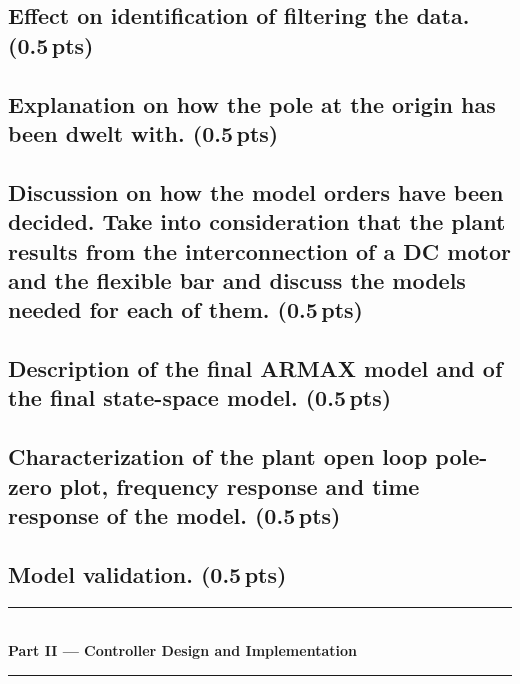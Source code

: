 \documentclass[a4paper,12pt]{article}
\begin{document}
\subsection{Effect on identification of filtering the data. (0.5\,pts)}
\vspace{10pt}


\subsection{Explanation on how the pole at the origin has been dwelt with. (0.5\,pts)}
\vspace{10pt}


\subsection{Discussion on how the model orders have been decided. Take into consideration that the plant results from the interconnection of a DC motor and the flexible bar and discuss the models needed for each of them. (0.5\,pts)}
\vspace{10pt}


\subsection{Description of the final ARMAX model and of the final state-space model. (0.5\,pts)}
\vspace{10pt}


\subsection{Characterization of the plant open loop pole-zero plot, frequency response and time response of the model. (0.5\,pts)}
\vspace{10pt}


\subsection{Model validation. (0.5\,pts)}
\vspace{10pt}



\vspace{6pt}
\noindent\rule{\textwidth}{0.8pt}\\[-4pt]
{\Large\bfseries Part II --- Controller Design and Implementation}\\[-6pt]
\noindent\rule{\textwidth}{0.8pt}
\vspace{4pt}
\end{document}
